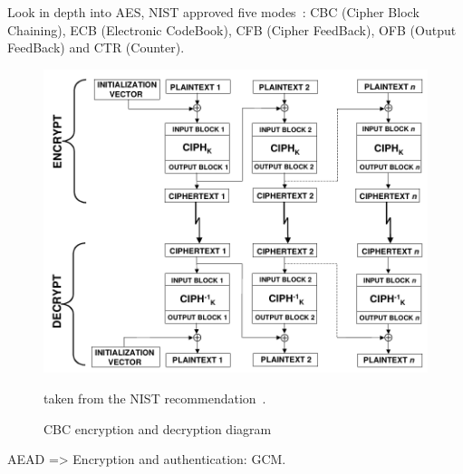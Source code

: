 Look in depth into AES, NIST approved five modes~\cite{nist-sp800-38A}: CBC (Cipher Block Chaining), ECB (Electronic CodeBook), CFB (Cipher FeedBack), OFB (Output FeedBack) and CTR (Counter).

\begin{figure}
\includegraphics[width=\textwidth]{nist-cbc}
\caption{CBC encryption and decryption diagram}{taken from the NIST recommendation~\cite{nist-sp800-38A}.}
\label{fig:cbc-encrypt-decrypt}
\end{figure}

AEAD => Encryption and authentication: GCM.

